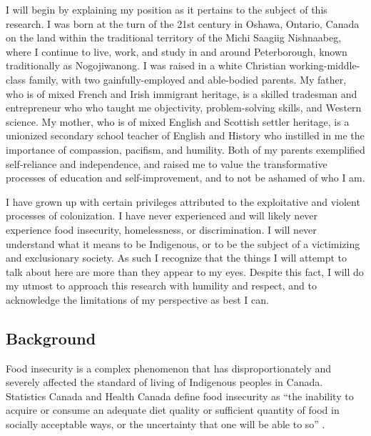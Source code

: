 \documentclass{report}
\begin{document}
\hspace{24pt} I will begin by explaining my position as it pertains to the subject of this research. I was born at the turn of the 21st century in Oshawa, Ontario, Canada on the land within the traditional territory of the Michi Saagiig Nishnaabeg, where I continue to live, work, and study in and around Peterborough, known traditionally as Nogojiwanong. I was raised in a white Christian working-middle-class family, with two gainfully-employed and able-bodied parents. My father, who is of mixed French and Irish immigrant heritage, is a skilled tradesman and entrepreneur who who taught me objectivity, problem-solving skills, and Western science. My mother, who is of mixed English and Scottish settler heritage, is a unionized secondary school teacher of English and History who instilled in me the importance of compassion, pacifism, and humility. Both of my parents exemplified self-reliance and independence, and raised me to value the transformative processes of education and self-improvement, and to not be ashamed of who I am.

\hspace{24pt} I have grown up with certain privileges attributed to the exploitative and violent processes of colonization. I have never experienced and will likely never experience food insecurity, homelessness, or discrimination. I will never understand what it means to be Indigenous, or to be the subject of a victimizing and exclusionary society. As such I recognize that the things I will attempt to talk about here are more than they appear to my eyes. Despite this fact, I will do my utmost to approach this research with humility and respect, and to acknowledge the limitations of my perspective as best I can.

\clearpage

\subsection{Background}



\hspace{24pt} Food insecurity is a complex phenomenon that has disproportionately and severely affected the standard of living of Indigenous peoples in Canada.
Statistics Canada and Health Canada define food insecurity as ``the inability to acquire or consume an adequate diet quality or sufficient quantity of food in socially acceptable ways, or the uncertainty that one will be able to so'' \parencite{statscanfoodinsecurity}.
\end{document}
